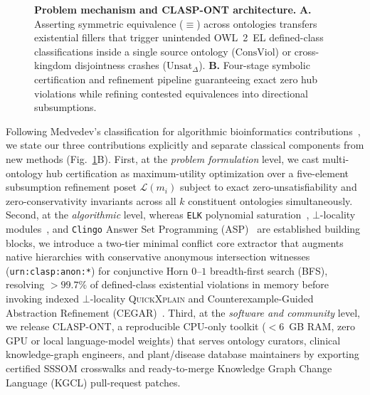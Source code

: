 \documentclass[10pt]{article}
\theoremstyle{accentdef}
\begin{document}
\begin{figure}[t]
{%
}
\caption{\textbf{Problem mechanism and \textsc{CLASP-ONT} architecture.} \textbf{A.} Asserting symmetric equivalence ($\equiv$) across ontologies transfers existential fillers that trigger unintended OWL~2~EL defined-class classifications inside a single source ontology ($\mathrm{ConsViol}$) or cross-kingdom disjointness crashes ($\mathrm{Unsat}_{\Delta}$). \textbf{B.} Four-stage symbolic certification and refinement pipeline guaranteeing exact zero hub violations while refining contested equivalences into directional subsumptions.}
\label{fig:architecture}
\end{figure}

Following Medvedev's classification for algorithmic bioinformatics contributions~\cite{medvedev2023theoretical}, we state our three contributions explicitly and separate classical components from new methods (Fig.~\ref{fig:architecture}B). First, at the \emph{problem formulation} level, we cast multi-ontology hub certification as maximum-utility optimization over a five-element subsumption refinement poset $\mathcal{L}(m_i)$ subject to exact zero-unsatisfiability and zero-conservativity invariants across all $k$ constituent ontologies simultaneously. Second, at the \emph{algorithmic} level, whereas \texttt{ELK} polynomial saturation~\cite{kazakov2014elk}, $\bot$-locality modules~\cite{cuencagrau2008modular}, and \texttt{Clingo} Answer Set Programming (ASP)~\cite{gebser2011potassco,gebser2019clingo} are established building blocks, we introduce a two-tier minimal conflict core extractor that augments native hierarchies with conservative anonymous intersection witnesses (\texttt{urn:clasp:anon:*}) for conjunctive Horn $0\text{--}1$ breadth-first search (BFS), resolving $>99.7\%$ of defined-class existential violations in memory before invoking indexed $\bot$-locality \textsc{QuickXplain} and Counterexample-Guided Abstraction Refinement (CEGAR)~\cite{clarke2003cegar}. Third, at the \emph{software and community} level, we release \textsc{CLASP-ONT}, a reproducible CPU-only toolkit ($< 6$~GB RAM, zero GPU or local language-model weights) that serves ontology curators, clinical knowledge-graph engineers, and plant/disease database maintainers by exporting certified SSSOM crosswalks and ready-to-merge Knowledge Graph Change Language (KGCL) pull-request patches.
\end{document}
